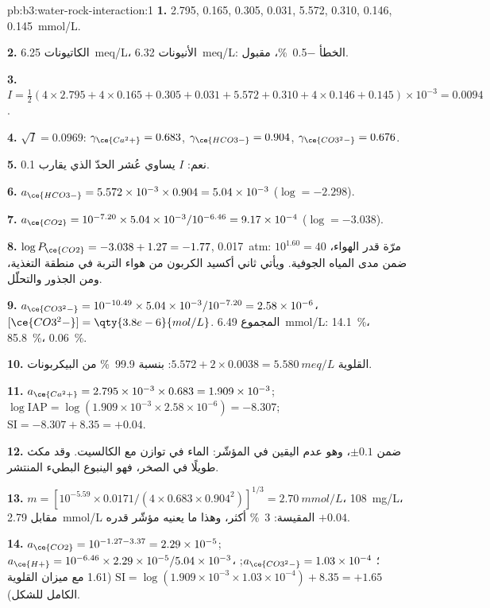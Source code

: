\begin{solution}{pb:b3:water-rock-interaction:1}
\textbf{1.}  2.795,  0.165,  0.305,  0.031,
 5.572,  0.310,  0.146,  \qty{0.145}{mmol/L}.

\textbf{2.} الكاتيونات \qty{6.25}{meq/L}، الأنيونات \qty{6.32}{meq/L}: الخطأ
\qty{-0.5}{\percent}، مقبول.

\textbf{3.} $I = \tfrac12(4\times2.795 + 4\times0.165 + 0.305 + 0.031 + 5.572
+ 0.310 + 4\times0.146 + 0.145)\times10^{-3} = 0.0094$.

\textbf{4.} $\sqrt I = 0.0969$: $\gamma_{\ce{Ca^2+}} = 0.683$,
$\gamma_{\ce{HCO3-}} = 0.904$, $\gamma_{\ce{CO3^2-}} = 0.676$.

\textbf{5.} نعم: $I$ يساوي عُشر الحدّ الذي يقارب 0.1.

\textbf{6.} $a_{\ce{HCO3-}} = 5.572\times10^{-3}\times0.904 = 5.04\times
10^{-3}$ ($\log = -2.298$).

\textbf{7.} $a_{\ce{CO2}} = 10^{-7.20}\times5.04\times10^{-3}/10^{-6.46} =
9.17\times10^{-4}$ ($\log = -3.038$).

\textbf{8.} $\log P_{\ce{CO2}} = -3.038 + 1.27 = -1.77$, \qty{0.017}{atm}:
$10^{1.60} = 40$ مرّة قدر الهواء، ضمن مدى المياه الجوفية. ويأتي ثاني
أكسيد الكربون من هواء التربة في منطقة التغذية، ومن الجذور والتحلّل.

\textbf{9.} $a_{\ce{CO3^2-}} = 10^{-10.49}\times5.04\times10^{-3}/10^{-7.20}
= 2.58\times10^{-6}$، $[\ce{CO3^2-}] = \qty{3.8e-6}{mol/L}$. المجموع
\qty{6.49}{mmol/L}:  \qty{14.1}{\percent}، 
\qty{85.8}{\percent}،  \qty{0.06}{\percent}.

\textbf{10.} القلوية $5.572 + 2\times0.0038 = \qty{5.580}{meq/L}$:
بنسبة \qty{99.9}{\percent} من البيكربونات.

\textbf{11.} $a_{\ce{Ca^2+}} = 2.795\times10^{-3}\times0.683 = 1.909\times
10^{-3}$; $\log\mathrm{IAP} = \log(1.909\times10^{-3}\times2.58\times10^{-6})
= -8.307$; $\mathrm{SI} = -8.307 + 8.35 = +0.04$.

\textbf{12.} ضمن $\pm0.1$، وهو عدم اليقين في المؤشّر: الماء في
توازن مع الكالسيت. وقد مكث طويلًا في الصخر، فهو الينبوع البطيء
المنتشر.

\textbf{13.} $m = [10^{-5.59}\times0.0171/(4\times0.683\times0.904^2)]^{1/3}
= \qty{2.70}{mmol/L}$، \qty{108}{mg/L}، مقابل \qty{2.79}{mmol/L} المقيسة:
\qty{3}{\percent} أكثر، وهذا ما يعنيه مؤشّر قدره $+0.04$.

\textbf{14.} $a_{\ce{CO2}} = 10^{-1.27 - 3.37} = 2.29\times10^{-5}$;
$a_{\ce{H+}} = 10^{-6.46}\times2.29\times10^{-5}/5.04\times10^{-3}$، ؛
$a_{\ce{CO3^2-}} = 1.03\times10^{-4}$; $\mathrm{SI} = \log(1.909\times
10^{-3}\times1.03\times10^{-4}) + 8.35 = +1.65$ (1.61 مع ميزان القلوية
الكامل للشكل).


\end{solution}
